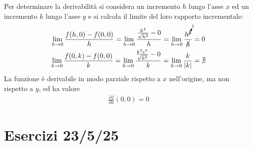 \documentclass{article}
\numberwithin{equation}{subsection}
\begin{document}
Per determinare la derivabilità si considera un incremento $h$ lungo l'asse $x$ ed un incremento $k$ lungo l'asse $y$ e si calcola il limite del loro rapporto incrementale:
\begin{gather*}
    \lim_{h\to0}\frac{f(h,0)-f(0,0)}{h}=
    \lim_{h\to0}\frac{\frac{h^4}{\sqrt{h^2}}-0}{h}=
    \lim_{h\to0}\frac{h^{\cancelto{2}{3}}}{\cancel{h}}=0\\
    \lim_{k\to0}\frac{f(0,k)-f(0,0)}{k}=
    \lim_{k\to0}\frac{\frac{k^2e^0}{\sqrt{k^2}}-0}{k}=
    \lim_{k\to0}\frac{k}{|k|}=\nexists
\end{gather*}
La funzione è derivabile in modo parziale rispetto a $x$ nell'origine, ma non rispetto a $y$, ed ha valore
\begin{gather*}
    \displaystyle\frac{\partial f}{\partial x}(0,0)=0
\end{gather*}

\clearpage

\section{Esercizi 23/5/25}
\end{document}
